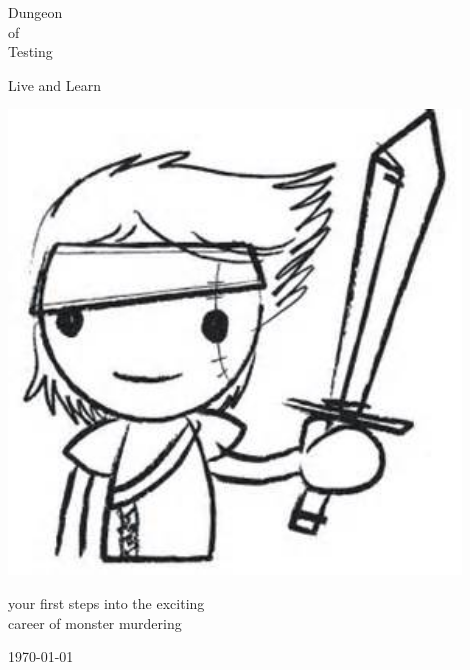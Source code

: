 \begin{center}

\huge         Dungeon  \\
                of     \\
              Testing

\vspace{0.3\baselineskip}

\large     Live and Learn

\vspace{2cm}

\includegraphics[width=120mm]{./fig/noob.jpg}

\vspace{2 cm}


\normalsize
          your first steps into the exciting    \\
            career of monster murdering

\vfill

\today

\end{center}






\clearpage
\thispagestyle{empty}
\raggedbottom

